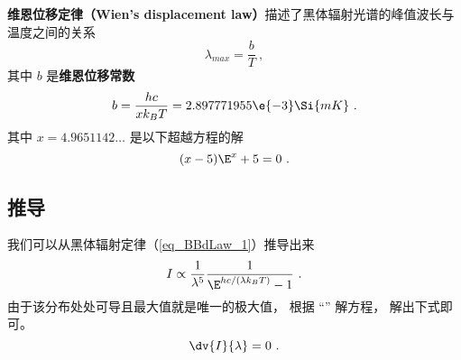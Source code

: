 

\textbf{维恩位移定律（Wien's displacement law）}描述了黑体辐射光谱的峰值波长与温度之间的关系
\begin{equation}
\lambda_{max} = \frac{b}{T}~,
\end{equation}
其中 $b$ 是\textbf{维恩位移常数}
\begin{equation}
b = \frac{hc}{xk_B T} = 2.897771955\e{-3} \Si{mK}~.
\end{equation}
其中 $x = 4.9651142\dots$ 是以下超越方程的解
\begin{equation}
(x-5)\E^x + 5 = 0~.
\end{equation}

\subsection{推导}

我们可以从黑体辐射定律（\autoref{eq_BBdLaw_1}）推导出来
\begin{equation}
I \propto \frac{1}{\lambda^5} \frac{1}{\E^{hc/(\lambda k_B T)} - 1}~.
\end{equation}
由于该分布处处可导且最大值就是唯一的极大值， 根据 “” 解方程， 解出下式即可。
\begin{equation}
\dv{I}{\lambda} = 0~.
\end{equation}
